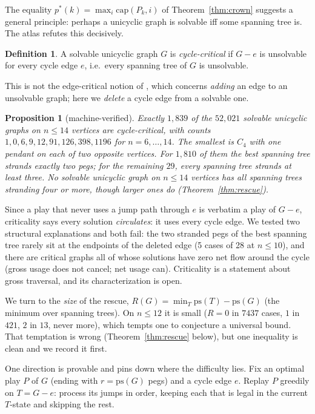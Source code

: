 \documentclass[11pt]{article}
\newtheorem{proposition}[theorem]{Proposition}
\theoremstyle{definition}
\newtheorem{definition}[theorem]{Definition}
\newcommand{\ps}{\mathrm{ps}}
\newcommand{\cp}{\mathrm{cap}}
\begin{document}
The equality $p^*(k)=\max_i\cp(P_k,i)$ of Theorem~\ref{thm:crown}
suggests a general principle: perhaps a unicyclic graph is solvable
iff some spanning tree is. The atlas refutes this decisively.

\begin{definition}
A solvable unicyclic graph $G$ is \emph{cycle-critical} if $G-e$ is
unsolvable for every cycle edge $e$, i.e.\ every spanning tree of
$G$ is unsolvable.
\end{definition}

This is not the edge-critical notion of \cite{BGedge}, which concerns
\emph{adding} an edge to an unsolvable graph; here we \emph{delete} a
cycle edge from a solvable one.

\begin{proposition}[machine-verified]\label{prop:critical}
Exactly $1{,}839$ of the $52{,}021$ solvable unicyclic graphs on
$n\le 14$ vertices are cycle-critical, with counts
$1,0,6,9,12,91,126,398,1196$ for $n=6,\dots,14$. The smallest is
$C_4$ with one pendant on each of two opposite vertices. For
$1{,}810$ of them the best spanning tree strands exactly two pegs;
for the remaining $29$, every spanning tree strands at least three.
No solvable unicyclic graph on $n\le14$ vertices has all spanning
trees stranding four or more, though larger ones do
(Theorem~\ref{thm:rescue}).
\end{proposition}

Since a play that never uses a jump path through $e$ is verbatim a
play of $G-e$, criticality says every solution \emph{circulates}:
it uses every cycle edge. We tested two structural explanations and
both fail: the two stranded pegs of the best spanning tree rarely
sit at the endpoints of the deleted edge (5 cases of 28 at
$n\le10$), and there are critical graphs all of whose solutions
have zero net flow around the cycle (gross usage does not cancel;
net usage can). Criticality is a statement about gross traversal,
and its characterization is open.

We turn to the \emph{size} of the rescue,
$R(G)=\min_T\ps(T)-\ps(G)$ (the minimum over spanning trees). On
$n\le 12$ it is small ($R=0$ in $7437$ cases, $1$ in $421$, $2$ in
$13$, never more), which tempts one to conjecture a universal
bound. That temptation is wrong (Theorem~\ref{thm:rescue} below), but
one inequality is clean and we record it first.

One direction is provable and pins down where the difficulty lies.
Fix an optimal play $P$ of $G$ (ending with $r=\ps(G)$ pegs) and a
cycle edge $e$. Replay $P$ greedily on $T=G-e$: process its jumps in
order, keeping each that is legal in the current $T$-state and
skipping the rest.
\end{document}

